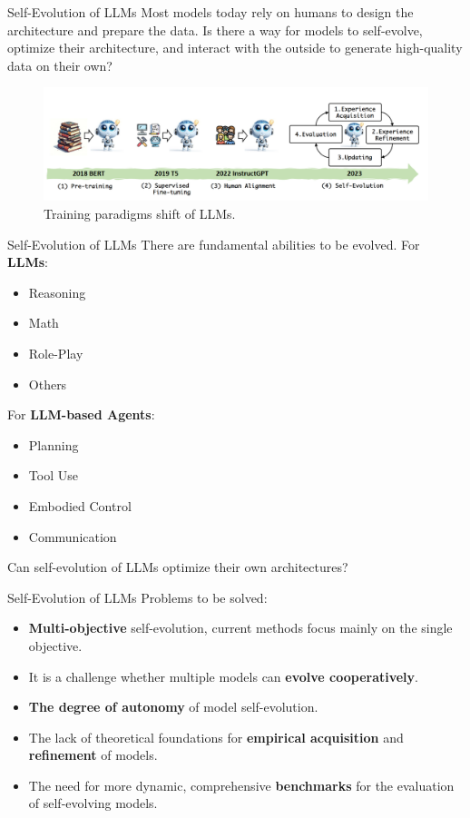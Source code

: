 \documentclass[10pt]{beamer}
\begin{document}
\begin{frame}{Self-Evolution of LLMs}
Most models today rely on humans to design the architecture and prepare the data.
Is there a way for models to self-evolve, optimize their architecture, and interact with the outside to generate high-quality data on their own?
\begin{figure}
    \centering
    \includegraphics[width=\textwidth]{pic/LLMShift.png}
    \caption{Training paradigms shift of LLMs.\cite{LLMsurvey}}
    \label{fig:my_label}
\end{figure}
\end{frame}

\begin{frame}{Self-Evolution of LLMs}
There are fundamental abilities to be evolved.\cite{LLMsurvey}
For \textbf{LLMs}:
\begin{itemize}
    \item Reasoning
    \item Math
    \item Role-Play
    \item Others
\end{itemize}
For \textbf{LLM-based Agents}:
\begin{itemize}
    \item Planning
    \item Tool Use
    \item Embodied Control
    \item Communication
\end{itemize}
Can self-evolution of LLMs optimize their own architectures?
\end{frame}

\begin{frame}{Self-Evolution of LLMs}
Problems to be solved:
\begin{itemize}
    \item \textbf{Multi-objective} self-evolution, current methods focus mainly on the single objective.
    \item It is a challenge whether multiple models can \textbf{evolve cooperatively}.
    \item \textbf{The degree of autonomy} of model self-evolution.
    \item The lack of theoretical foundations for \textbf{empirical acquisition} and \textbf{refinement} of models.
    \item The need for more dynamic, comprehensive \textbf{benchmarks} for the evaluation of self-evolving models.
\end{itemize}
\end{frame}
\end{document}
